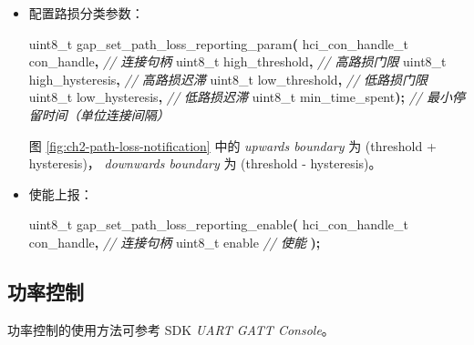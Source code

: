 \documentclass[
  12pt,
]{book}
\newenvironment{Shaded}{\begin{snugshade}}{\end{snugshade}}
\newcommand{\CommentTok}[1]{\textcolor[rgb]{0.56,0.35,0.01}{\textit{#1}}}
\newcommand{\DataTypeTok}[1]{\textcolor[rgb]{0.13,0.29,0.53}{#1}}
\newcommand{\NormalTok}[1]{#1}
\newcommand{\OperatorTok}[1]{\textcolor[rgb]{0.81,0.36,0.00}{\textbf{#1}}}
\begin{document}
\begin{itemize}
\item
  配置路损分类参数：

\begin{Shaded}
\begin{Highlighting}[]
\DataTypeTok{uint8\_t}\NormalTok{ gap\_set\_path\_loss\_reporting\_param}\OperatorTok{(}
\NormalTok{  hci\_con\_handle\_t con\_handle}\OperatorTok{,}  \CommentTok{// 连接句柄}
  \DataTypeTok{uint8\_t}\NormalTok{ high\_threshold}\OperatorTok{,}       \CommentTok{// 高路损门限}
  \DataTypeTok{uint8\_t}\NormalTok{ high\_hysteresis}\OperatorTok{,}      \CommentTok{// 高路损迟滞}
  \DataTypeTok{uint8\_t}\NormalTok{ low\_threshold}\OperatorTok{,}        \CommentTok{// 低路损门限}
  \DataTypeTok{uint8\_t}\NormalTok{ low\_hysteresis}\OperatorTok{,}       \CommentTok{// 低路损迟滞}
  \DataTypeTok{uint8\_t}\NormalTok{ min\_time\_spent}\OperatorTok{);}      \CommentTok{// 最小停留时间（单位连接间隔）}
\end{Highlighting}
\end{Shaded}

  图 \ref{fig:ch2-path-loss-notification} 中的 \emph{upwards boundary} 为 (threshold + hysteresis)，
  \emph{downwards boundary} 为 (threshold - hysteresis)。
\item
  使能上报：

\begin{Shaded}
\begin{Highlighting}[]
\DataTypeTok{uint8\_t}\NormalTok{ gap\_set\_path\_loss\_reporting\_enable}\OperatorTok{(}
\NormalTok{  hci\_con\_handle\_t con\_handle}\OperatorTok{,}  \CommentTok{// 连接句柄}
  \DataTypeTok{uint8\_t}\NormalTok{ enable                }\CommentTok{// 使能}
\OperatorTok{);}
\end{Highlighting}
\end{Shaded}
\end{itemize}

\hypertarget{ch-conn-power-ctrl}{%
\subsection{功率控制}\label{ch-conn-power-ctrl}}

功率控制的使用方法可参考 SDK \emph{UART GATT Console}。
\end{document}
